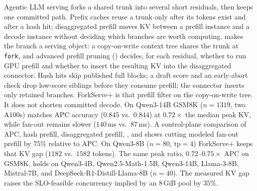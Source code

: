 Agentic LLM serving forks a shared trunk into several short residuals, then keeps one committed path.
Prefix caches reuse a trunk only after its tokens exist and after a hash hit; disaggregated prefill moves KV between a prefill instance and a decode instance without deciding which branches are worth computing.
\sys makes the branch a serving object: a copy-on-write context tree shares the trunk at \texttt{fork}, and advanced prefill pruning (\app) decides, for each residual, whether to run GPU prefill and whether to insert the resulting KV into the disaggregated connector.
Hash hits skip published full blocks; a draft score and an early-abort check drop low-score siblings before they consume prefill; the connector inserts only retained branches.
ForkServe+ is that prefill filter on the copy-on-write tree. It does not shorten committed decode.
On Qwen3-14B GSM8K ($n{=}1319$, two A100s) \sys matches APC accuracy ($0.845$ vs.\ $0.844$) at $0.72\times$ the median peak KV, while fan-out remains slower ($140$\,ms vs.\ $87$\,ms).
A control-plane comparison of APC, hash prefill, disaggregated prefill, \sys, and \app shows \app cutting modeled fan-out prefill by $75\%$ relative to APC.
On Qwen3-8B ($n{=}80$, $\mathrm{tp}{=}4$) ForkServe+ keeps that KV gap ($1182$ vs.\ $1582$ tokens).
The same peak ratio, $0.72$--$0.75\times$ APC on GSM8K, holds on Qwen3-4B, Qwen2.5-Math-1.5B, Qwen3-14B, Llama-3-8B, Mistral-7B, and DeepSeek-R1-Distill-Llama-8B ($n{=}40$).
The measured KV gap raises the SLO-feasible concurrency implied by an $8$\,GiB pool by $35\%$.
